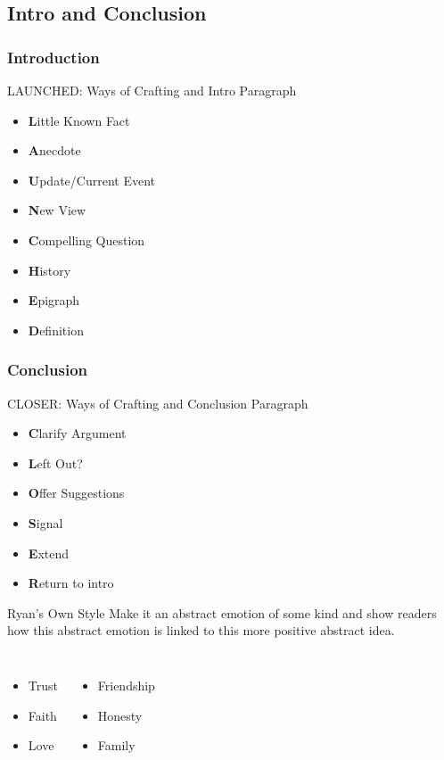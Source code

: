 \documentclass{beamer}
\begin{document}
\subsection{Intro and Conclusion}
\begin{frame}
\frametitle{Introduction}
\begin{block}{LAUNCHED: Ways of Crafting and Intro Paragraph}
\begin{itemize}
\item \textbf{L}ittle Known Fact
\item \textbf{A}necdote
\item \textbf{U}pdate/Current Event
\item \textbf{N}ew View
\item \textbf{C}ompelling Question
\item \textbf{H}istory
\item \textbf{E}pigraph
\item \textbf{D}efinition
\end{itemize}
\end{block}
\end{frame}
\begin{frame}
\frametitle{Conclusion}
\begin{block}{CLOSER: Ways of Crafting and Conclusion Paragraph}
\begin{itemize}
\item \textbf{C}larify Argument
\item \textbf{L}eft Out?
\item \textbf{O}ffer Suggestions
\item \textbf{S}ignal
\item \textbf{E}xtend
\item \textbf{R}eturn to intro
\end{itemize}
\end{block}

\begin{block}{Ryan's Own Style}
Make it an abstract emotion of some kind and show readers how this abstract emotion is linked to this more positive abstract idea.
\begin{columns}[c]
\begin{itemize}
\item Trust
\item Faith
\item Love
\end{itemize}
\begin{itemize}
\item Friendship
\item Honesty
\item Family
\end{itemize}
\end{columns}
\end{block}
\end{frame}
\end{document}
